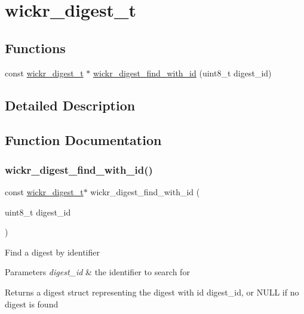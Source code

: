\hypertarget{group__wickr__digest}{}\section{wickr\+\_\+digest\+\_\+t}
\label{group__wickr__digest}
\subsection*{Functions}
\begin{DoxyCompactItemize}
\item 
const \hyperlink{structwickr__digest}{wickr\+\_\+digest\+\_\+t} $\ast$ \hyperlink{group__wickr__digest_ga64a18a57a861988bf1a4898bebc712cb}{wickr\+\_\+digest\+\_\+find\+\_\+with\+\_\+id} (uint8\+\_\+t digest\+\_\+id)
\end{DoxyCompactItemize}


\subsection{Detailed Description}


\subsection{Function Documentation}
\mbox{\label{group__wickr__digest_ga64a18a57a861988bf1a4898bebc712cb}} 
\subsubsection{\texorpdfstring{wickr\+\_\+digest\+\_\+find\+\_\+with\+\_\+id()}{wickr\_digest\_find\_with\_id()}}
{\footnotesize\ttfamily const \hyperlink{structwickr__digest}{wickr\+\_\+digest\+\_\+t}$\ast$ wickr\+\_\+digest\+\_\+find\+\_\+with\+\_\+id (\begin{DoxyParamCaption}\item[{uint8\+\_\+t}]{digest\+\_\+id }\end{DoxyParamCaption})}

Find a digest by identifier


\begin{DoxyParams}{Parameters}
{\em digest\+\_\+id} & the identifier to search for \\
\hline
\end{DoxyParams}
\begin{DoxyReturn}{Returns}
a digest struct representing the digest with id \textquotesingle{}digest\+\_\+id\textquotesingle{}, or N\+U\+LL if no digest is found 
\end{DoxyReturn}
